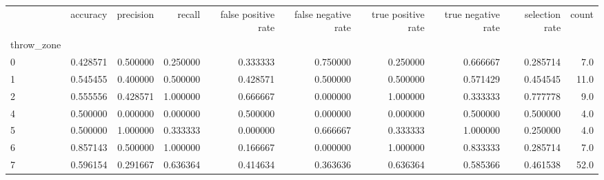 \begin{tabular}{lrrrrrrrrr}
\toprule
{} &  accuracy &  precision &    recall &  false positive rate &  false negative rate &  true positive rate &  true negative rate &  selection rate &  count \\
throw\_zone &           &            &           &                      &                      &                     &                     &                 &        \\
\midrule
0          &  0.428571 &   0.500000 &  0.250000 &             0.333333 &             0.750000 &            0.250000 &            0.666667 &        0.285714 &    7.0 \\
1          &  0.545455 &   0.400000 &  0.500000 &             0.428571 &             0.500000 &            0.500000 &            0.571429 &        0.454545 &   11.0 \\
2          &  0.555556 &   0.428571 &  1.000000 &             0.666667 &             0.000000 &            1.000000 &            0.333333 &        0.777778 &    9.0 \\
4          &  0.500000 &   0.000000 &  0.000000 &             0.500000 &             0.000000 &            0.000000 &            0.500000 &        0.500000 &    4.0 \\
5          &  0.500000 &   1.000000 &  0.333333 &             0.000000 &             0.666667 &            0.333333 &            1.000000 &        0.250000 &    4.0 \\
6          &  0.857143 &   0.500000 &  1.000000 &             0.166667 &             0.000000 &            1.000000 &            0.833333 &        0.285714 &    7.0 \\
7          &  0.596154 &   0.291667 &  0.636364 &             0.414634 &             0.363636 &            0.636364 &            0.585366 &        0.461538 &   52.0 \\
\bottomrule
\end{tabular}
